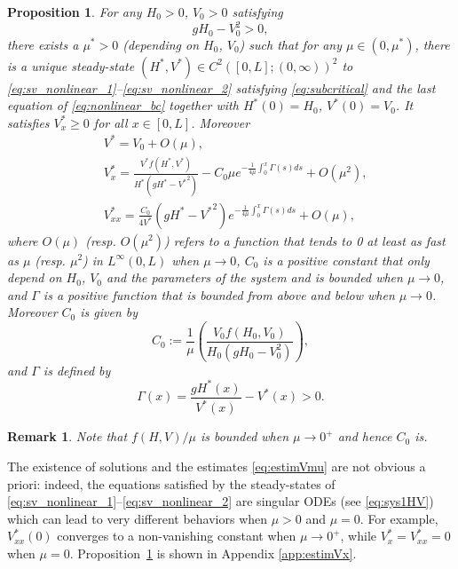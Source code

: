 \documentclass[11pt]{article}
\newtheorem{rmk}{Remark}[section]
\newtheorem{proposition}{Proposition}[section]
\begin{document}
\begin{proposition}
\label{prop:estimVx}
For any $H_{0}>0$, $V_{0}>0$ satisfying
\begin{equation}
    gH_{0}-V_{0}^{2}>0,
\end{equation}
there exists a $\mu^{*}>0$ {(depending on $H_{0}$, $V_{0}$)} such that for any $\mu\in(0,\mu^{*})$, there is a unique steady-state $(H^{*},V^{*})\in C^{2}([0,L];(0,\infty))^{2}$  to \eqref{eq:sv_nonlinear_1}--\eqref{eq:sv_nonlinear_2} satisfying {\eqref{eq:subcritical} and} the last equation of \eqref{eq:nonlinear_bc} together with $H^{*}(0)=H_{0}$, $V^{*}(0)=V_{0}$. It satisfies $V^{*}_{x} \geq 0$ for all $x \in [0,L]$.
Moreover
\begin{equation}
\label{eq:estimVmu}
\begin{split}
& V^{*} = V_{0}+O(\mu),\\
    &V_{x}^{*} = \frac{V^{*}f(H^{*},V^{*})}{H^{*}(gH^{*}-{V^{*}}^{2})}-C_{0}\mu e^{-\frac{1}{4\mu}\int_{0}^{x} {\Gamma(s)} ds}+O(\mu^{2}),\\ &V_{xx}^{*} = \frac{C_{0}}{4V^{*}}\left(g H^{*}-{V^{*}}^{2}\right)e^{-\frac{1}{4\mu}\int_{0}^{x} {\Gamma(s)} ds}+ O(\mu),
    \end{split}
\end{equation}
 where $O(\mu)$ 
 (resp. $O(\mu^{2})$) refers to a function that tends to 0 at least as fast as $\mu$ (resp. $\mu^{2}$) in $L^{\infty}(0,L)$ when $\mu\rightarrow 0$, $C_{0}$ is a positive constant that only depend on $H_{0}$, $V_{0}$ and the parameters of the system and is bounded when $\mu\rightarrow 0$, and ${\Gamma}$ is a positive function that is bounded from above and below when $\mu\rightarrow 0$. Moreover $C_{0}$ is given by
 \begin{equation}
      C_{0} := \frac{1}{\mu}\left(\frac{V_{0}f(H_{0},V_{0})}{H_{0}(gH_{0}-V_{0}^{2})}\right),
 \end{equation}
 and ${\Gamma}$ is defined by
 \begin{equation}
    {\Gamma(x)} = \frac{gH^{*}(x)}{V^{*}(x)}-V^{*}(x) > 0.
 \end{equation}
 
\end{proposition}
\begin{rmk}
    Note that $f(H,V) / \mu$ is bounded when $\mu\rightarrow 0^{+}$ and hence $C_{0}$ is.
\end{rmk}
The existence of solutions and the estimates \eqref{eq:estimVmu} are not obvious a priori: indeed, the equations satisfied by the steady-states of \eqref{eq:sv_nonlinear_1}--\eqref{eq:sv_nonlinear_2} are singular ODEs (see \eqref{eq:sys1HV}) which can lead to very different behaviors when $\mu>0$ and $\mu=0$. {For example, $V_{xx}^{*}(0)$ converges to a non-vanishing constant when $\mu\rightarrow 0^{+}$, while $V_{x}^{*}=V_{xx}^{*}=0$ when $\mu=0$.} Proposition~\ref{prop:estimVx} is shown in Appendix \ref{app:estimVx}. 
\end{document}
